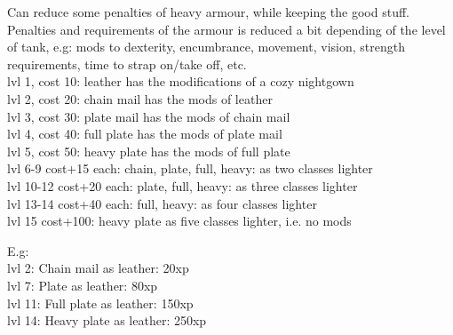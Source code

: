  \label{skill:tank}
 Can reduce some penalties of heavy armour, while keeping the good stuff. Penalties and requirements of the armour is reduced a bit depending of the level of tank, e.g: mods to dexterity, encumbrance, movement, vision, strength requirements, time to strap on/take off, etc.\\
lvl 1, cost 10: leather has the modifications of a cozy nightgown\\
lvl 2, cost 20: chain mail has the mods of leather \\
lvl 3, cost 30: plate mail has the mods of chain mail \\
lvl 4, cost 40: full plate has the mods of plate mail \\
lvl 5, cost 50: heavy plate has the mods of full plate \\
lvl 6-9 cost+15 each: chain, plate, full, heavy: as two classes lighter \\ %
lvl 10-12 cost+20 each: plate, full, heavy: as three classes lighter \\    %
lvl 13-14 cost+40 each: full, heavy: as four classes lighter \\            %
lvl 15 cost+100: heavy plate as five classes lighter, i.e. no mods         %

\noindent E.g:\\
lvl  2: Chain mail as leather: 20xp\\     %
lvl  7: Plate as leather: 80xp\\          %
lvl 11: Full plate as leather: 150xp\\    %
lvl 14: Heavy plate as leather: 250xp     %

%
%
%


\closeskillslist

















